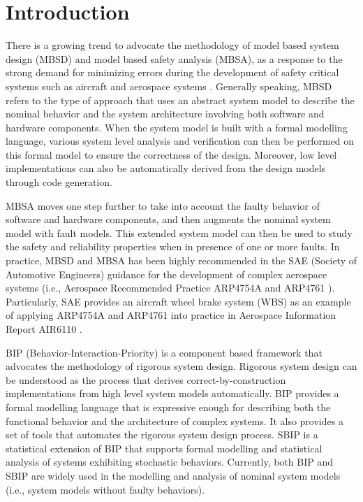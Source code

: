 
\section{Introduction}

There is a growing trend to advocate the methodology of model based system design (MBSD) and model based safety analysis (MBSA),
 as a response to the strong demand for minimizing errors during the development of safety critical systems such as aircraft and aerospace systems \cite{lctes10,issrew12}.
 Generally speaking, MBSD refers to the type of approach 
 that uses an abstract system model to describe the nominal behavior and the system architecture involving both software and hardware components.
 When the system model is built with a formal modelling language, various system level analysis and verification can then be performed on this formal model to ensure the correctness of the design.
 Moreover, low level implementations can also be automatically derived from the design models through code generation.

MBSA moves one step further to take into account the faulty behavior of software and hardware components,
 and then augments the nominal system model with fault models.
 This extended system model can then be used to study the safety and reliability properties when in presence of one or more faults.
% 
 In practice, MBSD and MBSA has been highly recommended in the SAE (Society of Automotive Engineers) guidance for the development of complex aerospace systems 
  (i.e., Aerospace Recommended Practice ARP4754A \cite{arp4754a} and ARP4761 \cite{arp4761}).
  Particularly, SAE provides an aircraft wheel brake system (WBS) as an example of applying ARP4754A and ARP4761 into practice 
  in Aerospace Information Report AIR6110 \cite{air6110}.


BIP (Behavior-Interaction-Priority) \cite{bip1,bip2} is a component based framework that advocates the methodology of rigorous system design.
 Rigorous system design can be understood as the process that derives correct-by-construction implementations from high level system models automatically.
 BIP provides a formal modelling language that is expressive enough for describing both the functional behavior and the architecture of complex systems.
 It also provides a set of tools that automates the rigorous system design process.
 SBIP \cite{sbip18} is a statistical extension of BIP that supports formal modelling and statistical analysis of systems exhibiting stochastic behaviors.
 Currently, both BIP and SBIP are widely used in the modelling and analysis of nominal system models (i.e., system models without faulty behaviors).

